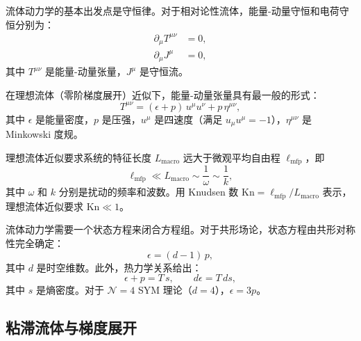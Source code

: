 \begin{definition}[理想流体]\label{def:ideal-fluid}
流体动力学的基本出发点是守恒律。对于相对论性流体，能量-动量守恒和电荷守恒分别为：
\begin{align}
    \partial_\mu T^{\mu\nu} &= 0, \label{eq:T-conservation}\\
    \partial_\mu J^{\mu} &= 0, \label{eq:J-conservation}
\end{align}
其中 $T^{\mu\nu}$ 是能量-动量张量，$J^{\mu}$ 是守恒流。

在理想流体（零阶梯度展开）近似下，能量-动量张量具有最一般的形式：
\begin{equation}\label{eq:ideal-fluid}
    T^{\mu\nu} = (\epsilon + p)\, u^\mu u^\nu + p\, \eta^{\mu\nu},
\end{equation}
其中 $\epsilon$ 是能量密度，$p$ 是压强，$u^\mu$ 是四速度（满足 $u_\mu u^\mu = -1$），$\eta^{\mu\nu}$ 是 Minkowski 度规。
\end{definition}

\begin{remark}[理想流体近似的适用条件]
理想流体近似要求系统的特征长度 $L_{\text{macro}}$ 远大于微观平均自由程 $\ell_{\text{mfp}}$，即
\begin{equation}
    \ell_{\text{mfp}} \ll L_{\text{macro}} \sim \frac{1}{\omega} \sim \frac{1}{k},
\end{equation}
其中 $\omega$ 和 $k$ 分别是扰动的频率和波数。用 Knudsen 数 $\text{Kn} = \ell_{\text{mfp}}/L_{\text{macro}}$ 表示，理想流体近似要求 $\text{Kn} \ll 1$。
\end{remark}

\begin{definition}[状态方程与热力学关系]\label{def:eos}
流体动力学需要一个状态方程来闭合方程组。对于共形场论，状态方程由共形对称性完全确定：
\begin{equation}\label{eq:conformal-eos}
    \epsilon = (d-1)\,p,
\end{equation}
其中 $d$ 是时空维数。此外，热力学关系给出：
\begin{equation}
    \epsilon + p = T\,s, \qquad d\epsilon = T\,ds,
\end{equation}
其中 $s$ 是熵密度。对于 $\mathcal{N}=4$ SYM 理论（$d=4$），$\epsilon = 3p$。
\end{definition}

\subsection{粘滞流体与梯度展开}

